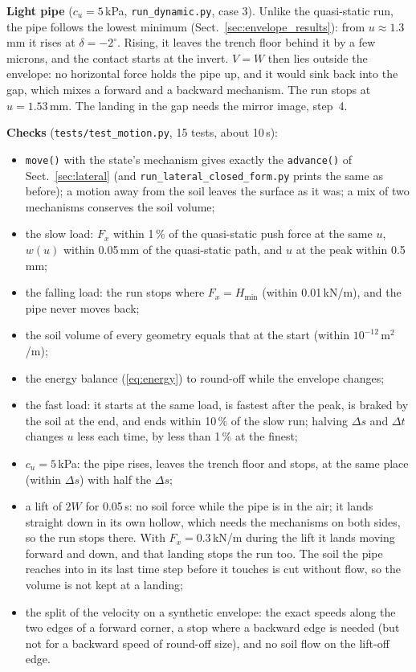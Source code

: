 \documentclass[11pt,a4paper]{article}
\begin{document}
\textbf{Light pipe} ($c_u = 5$\,kPa, \texttt{run\_dynamic.py}, case
3).  Unlike the quasi-static run, the pipe follows the lowest minimum
(Sect.~\ref{sec:envelope_results}): from $u \approx 1.3$\,mm it rises at
$\delta = -2^\circ$.  Rising, it leaves the trench floor behind it by a
few microns, and the contact starts at the invert.  $V = W$ then lies
outside the envelope: no horizontal force holds the pipe up, and it
would sink back into the gap, which mixes a forward and a backward
mechanism.  The run stops at $u = 1.53$\,mm.  The landing in the gap
needs the mirror image, step~4.

\textbf{Checks} (\texttt{tests/test\_motion.py}, 15 tests, about 10\,s):
\begin{itemize}
  \item \texttt{move()} with the state's mechanism gives exactly the
    \texttt{advance()} of Sect.~\ref{sec:lateral} (and
    \texttt{run\_lateral\_closed\_form.py} prints the same as before);
    a motion away from the soil leaves the surface as it was; a mix of
    two mechanisms conserves the soil volume;
  \item the slow load: $F_x$ within 1\,\% of the quasi-static push
    force at the same $u$, $w(u)$ within 0.05\,mm of the quasi-static
    path, and $u$ at the peak within 0.5\,mm;
  \item the falling load: the run stops where $F_x = H_\text{min}$
    (within 0.01\,kN/m), and the pipe never moves back;
  \item the soil volume of every geometry equals that at the start
    (within $10^{-12}$\,m$^2$/m);
  \item the energy balance (\ref{eq:energy}) to round-off while the
    envelope changes;
  \item the fast load: it starts at the same load, is fastest after the
    peak, is braked by the soil at the end, and ends within 10\,\% of
    the slow run; halving $\Delta s$ and $\Delta t$ changes $u$ less
    each time, by less than 1\,\% at the finest;
  \item $c_u = 5$\,kPa: the pipe rises, leaves the trench floor and
    stops, at the same place (within $\Delta s$) with half the
    $\Delta s$;
  \item a lift of $2W$ for 0.05\,s: no soil force while the pipe is in
    the air; it lands straight down in its own hollow, which needs the
    mechanisms on both sides, so the run stops there.  With
    $F_x = 0.3$\,kN/m during the lift it lands moving forward and down,
    and that landing stops the run too.  The soil the pipe reaches into
    in its last time step before it touches is cut without flow, so the
    volume is not kept at a landing;
  \item the split of the velocity on a synthetic envelope: the exact
    speeds along the two edges of a forward corner, a stop where a
    backward edge is needed (but not for a backward speed of round-off
    size), and no soil flow on the lift-off edge.
\end{itemize}
\end{document}
